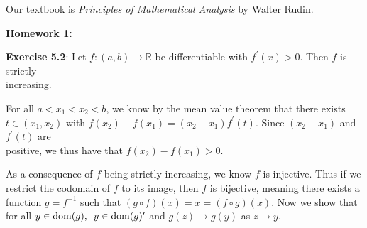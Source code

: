 \documentclass{book}
\newcommand{\pracOne}{
   \color{BrickRed}%
   \fontsize{13}{15}\selectfont%
}
\newcommand{\pracTwo}{
   \color{Orange}%
   \fontsize{12}{14}\selectfont%
}
\newenvironment{myIndent}{%
   \begin{adjustwidth}{2.5em}{0em}%
}{%
   \end{adjustwidth}%
}
\newcommand*{\markHW}[1]{%
   {\huge \color{Black} \textbf{#1} \newline}%
}
\newcommand{\myHS}{ \hspace{0.5em}}
\newcommand{\domain}[1]{\mathrm{dom}(#1)}
\newcommand{\retTwo}{\hfill\bigbreak}
\begin{document}
\retTwo

Our textbook is \textit{Principles of Mathematical Analysis} by Walter Rudin.

\newpage
\pracOne

\markHW{Homework 1:}

\textbf{Exercise 5.2}: Let $f: (a, b) \longrightarrow \mathbb{R}$ be differentiable with $f^\prime(x) > 0$. Then $f$ is strictly\\ increasing.

{\begin{myIndent}\pracTwo
   For all $a < x_1 < x_2 < b$, we know by the mean value theorem that there exists\\ $t \in (x_1, x_2)$ with $f(x_2) - f(x_1) = (x_2 - x_1)f^\prime(t)$. Since $(x_2 - x_1)$ and $f^\prime(t)$ are\\ positive, we thus have that $f(x_2) - f(x_1) > 0$.\retTwo
\end{myIndent}}

As a consequence of $f$ being strictly increasing, we know $f$ is injective. Thus if we\\ restrict the codomain of $f$ to its image, then $f$ is bijective, meaning there exists a\\ function $g = f^{-1}$ such that $(g \circ f)(x) = x = (f \circ g)(x)$. Now we show that\\ for all $y \in \domain{g},\myHS y \in \domain{g}^\prime$ and $g(z) \rightarrow g(y)$ as $z \rightarrow y$.
\end{document}
